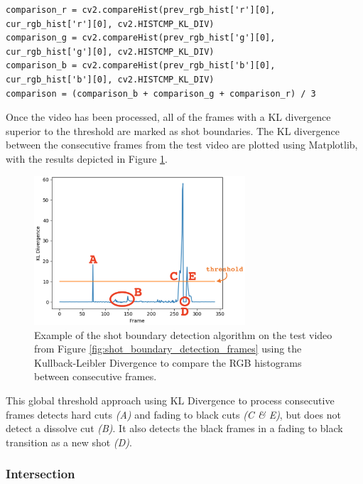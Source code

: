 \begin{lstlisting}[numbers=none]
comparison_r = cv2.compareHist(prev_rgb_hist['r'][0], cur_rgb_hist['r'][0], cv2.HISTCMP_KL_DIV)
comparison_g = cv2.compareHist(prev_rgb_hist['g'][0], cur_rgb_hist['g'][0], cv2.HISTCMP_KL_DIV)
comparison_b = cv2.compareHist(prev_rgb_hist['b'][0], cur_rgb_hist['b'][0], cv2.HISTCMP_KL_DIV)
comparison = (comparison_b + comparison_g + comparison_r) / 3
\end{lstlisting}

Once the video has been processed, all of the frames with a KL divergence superior to the threshold are marked as shot boundaries. The KL divergence between the consecutive frames from the test video are plotted using Matplotlib, with the results depicted in Figure \ref{fig:shot_boundary_detection_example}.

\begin{figure}[h] 
\centerline{\includegraphics[width=0.70\textwidth]{figures/implementation/shot_boundary_detection_example.png}}
\caption{\label{fig:shot_boundary_detection_example}Example of the shot boundary detection algorithm on the test video from Figure    \ref{fig:shot_boundary_detection_frames} using the Kullback-Leibler Divergence to compare the RGB histograms between consecutive frames.}
\end{figure}

This global threshold approach using KL Divergence to process consecutive frames detects hard cuts \textit{(A)} and fading to black cuts \textit{(C \& E)}, but does not detect a dissolve cut \textit{(B)}. It also detects the black frames in a fading to black transition as a new shot \textit{(D)}.

\subsubsection{Intersection}

